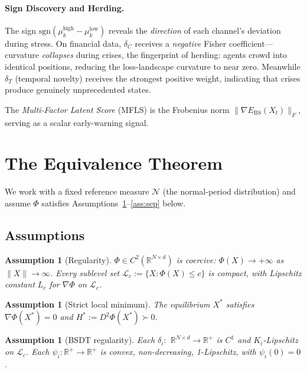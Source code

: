 \documentclass[final]{siamltex}
\newcommand{\R}{\mathbb{R}}
\newcommand{\norm}[1]{\lVert #1 \rVert}
\providecommand{\grad}{\nabla}
\newcommand{\Ebs}{E_{\mathrm{BS}}}
\newcommand{\Xst}{X^*}
\newtheorem{assumption}[theorem]{Assumption}
\begin{document}
\paragraph{Sign Discovery and Herding.}
The sign $\mathrm{sgn}(\mu_k^{\mathrm{high}}-\mu_k^{\mathrm{low}})$
reveals the \emph{direction} of each channel's deviation during
stress.  On financial data, $\delta_C$ receives a \emph{negative}
Fisher coefficient---curvature \emph{collapses} during crises,
the fingerprint of herding: agents crowd into identical positions,
reducing the loss-landscape curvature to near zero.  Meanwhile
$\delta_T$ (temporal novelty) receives the strongest positive
weight, indicating that crises produce genuinely unprecedented
states.

The \emph{Multi-Factor Latent Score} (MFLS) is the Frobenius norm
$\norm{\grad\Ebs(X_t)}_F$, serving as a scalar early-warning
signal.


\section{The Equivalence Theorem}\label{sec:equiv}

We work with a fixed reference measure $\mathcal{N}$ (the
normal-period distribution) and assume $\Phi$ satisfies
Assumptions~\ref{ass:reg}--\ref{ass:sep} below.

\subsection{Assumptions}

\begin{assumption}[Regularity]\label{ass:reg}
$\Phi\in C^2(\R^{N\times d})$ is coercive: $\Phi(X)\to+\infty$ as
$\norm{X}\to\infty$. Every sublevel set $\mathcal{L}_c:=
\{X:\Phi(X)\le c\}$ is compact, with Lipschitz constant $L_c$ for
$\grad\Phi$ on $\mathcal{L}_c$.
\end{assumption}

\begin{assumption}[Strict local minimum]\label{ass:equil}
The equilibrium $\Xst$ satisfies $\grad\Phi(\Xst)=0$ and
$H^*:=D^2\Phi(\Xst)\succ 0$.
\end{assumption}

\begin{assumption}[BSDT regularity]\label{ass:bsdt}
Each $\delta_i:$ $\R^{N\times d}\to\R^+$ is $C^1$ and
$K_i$-Lipschitz on $\mathcal{L}_c$. Each $\psi_i:\R^+\to\R^+$ is
convex, non-decreasing, 1-Lipschitz, with $\psi_i(0)=0$.
\end{assumption}
\end{document}

